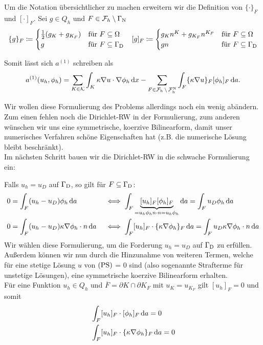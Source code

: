 \begin{notation}
	Um die Notation übersichtlicher zu machen erweitern wir die Definition von $ \{\cdot\}_F $ und $ [\cdot]_F $. Sei $ g \in Q_h $ und $ F \in \mathcal{F}_h \setminus \Gamma_{\text{N}} $
	\begin{align*}
		&\{ g \}_F \coloneqq
		 \begin{cases}
					\frac{1}{2} (g_K + g_{K_F} ) &\text{für } F \subseteq \Omega\\
					g &\text{für } F \subseteq \Gamma_{\text{D}}
		\end{cases}
	  &[g]_F \coloneqq \begin{cases}
			g_K n^K + g_{K_F} n^{K_F} &\text{für } F \subseteq \Omega\\
			g  n &\text{für } F \subseteq \Gamma_{\text{D}}
		\end{cases}
	\end{align*}
	
	Somit lässt sich $ a^{(1)} $ schreiben als
	\[a^{(1)}(u_h, \phi_h) = \sum_{K \in \mathcal{K}} \int_K \kappa \nabla u \cdot \nabla \phi_h \mathop{}\!\mathrm{d} x - \sum_{F \in \operatorname{\mathcal{F}_h} \setminus \operatorname{\mathcal{F}_h^{\text{N}}}} \int_{F} \{\kappa \nabla u \}_F [\phi_h]_F \mathop{}\!\mathrm{d} a. \]
\end{notation}





Wir wollen diese Formulierung des Problems allerdings noch ein wenig abändern. Zum einen fehlen noch die Dirichlet-RW in der Formulierung, zum anderen wünschen wir uns eine symmetrische, koerzive Bilinearform, damit unser numerisches Verfahren schöne Eigenschaften hat (z.B. die numerische Lösung bleibt beschränkt).\\
Im nächsten Schritt bauen wir die Dirichlet-RW in die schwache Formulierung ein:

Falls $ u_h = u_D $ auf $ \Gamma_{\text{D}} $, so gilt für $ F \subseteq \Gamma_{\text{D}}  $:
\begin{align}
	\label{D-RW1}& 0=\int_F (u_h - u_D) \phi_h \mathop{}\!\mathrm{d} a &&\iff \int_F \underbrace{[u_h]_F [\phi_h]_F}_{= u_h \phi_h n \cdot n = u_h \phi_h} \mathop{}\!\mathrm{d} a = \int_F u_D \phi_h \mathop{}\!\mathrm{d} a  \\
	\label{D-RW2}& 0  = \int_F (u_h - u_D) \kappa \nabla \phi_h \cdot n \mathop{}\!\mathrm{d} a  &&\iff \int_F [u_h]_F \cdot \{\kappa \nabla\phi_h\}_F \mathop{}\!\mathrm{d} a = \int_F u_D \kappa \nabla \phi_h \cdot n \mathop{}\!\mathrm{d} a 
\end{align} 
Wir wählen diese Formulierung, um die Forderung $ u_h = u_D $ auf $ \Gamma_{\text{D}} $ zu erfüllen. 
Außerdem können wir nun durch die Hinzunahme von weiteren Termen, welche für eine stetige Lösung $ u $ von $ \operatorname{(PS)} $ = 0 sind (also sogenannte Strafterme für unstetige Lösungen), eine symmetrische koerzive Bilinearform erhalten.\\
Für eine Funktion $ u_h \in Q_h $ und $ \overline{F} = \partial K \cap \partial K_F $ mit $ u_K = u_{K_F} $ gilt $ [u_h]_F = 0 $ und somit
\begin{align}
	\label{innen1} &\int_F [u_h]_F \cdot [\phi_h]_F \mathop{}\!\mathrm{d} a = 0\\
	\label{innen2}&\int_F [u_h]_F \cdot \{ \kappa\nabla\phi_h \}_F \mathop{}\!\mathrm{d} a = 0
\end{align}

